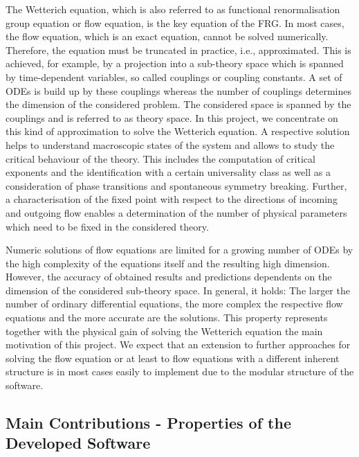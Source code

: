 \documentclass[paper=a4,11pt,bibliography=totoc]{scrartcl}
\begin{document}
The Wetterich equation, which is also referred to as functional renormalisation group equation or flow equation, is the key equation of the FRG. In most cases, the flow equation, which is an exact equation, cannot be solved numerically. Therefore, the equation must be truncated in practice, i.e., approximated. This is achieved, for example, by a projection into a sub-theory space which is spanned by time-dependent variables, so called couplings or coupling constants. A set of ODEs is build up by these couplings whereas the number of couplings determines the dimension of the considered problem. The considered space is spanned by the couplings and is referred to as theory space. In this project, we concentrate on this kind of approximation to solve the Wetterich equation. A respective solution helps to understand macroscopic states of the system and allows to study the critical behaviour of the theory. This includes the computation of critical exponents and the identification with a certain universality class as well as a consideration of phase transitions and spontaneous symmetry breaking. Further, a characterisation of the fixed point with respect to the directions of incoming and outgoing flow enables a determination of the number of physical parameters which need to be fixed in the considered theory.

Numeric solutions of flow equations are limited for a growing number of ODEs by the high complexity of the equations itself and the resulting high dimension. However, the accuracy of obtained results and predictions dependents on the dimension of the considered sub-theory space. In general, it holds: The larger the number of ordinary differential equations, the more complex the respective flow equations and the more accurate are the solutions. This property represents together with the physical gain of solving the Wetterich equation the main motivation of this project. We expect that an extension to further approaches for solving the flow equation or at least to flow equations with a different inherent structure is in most cases easily to implement due to the modular structure of the software.

\subsection{Main Contributions - Properties of the Developed Software}
\end{document}
